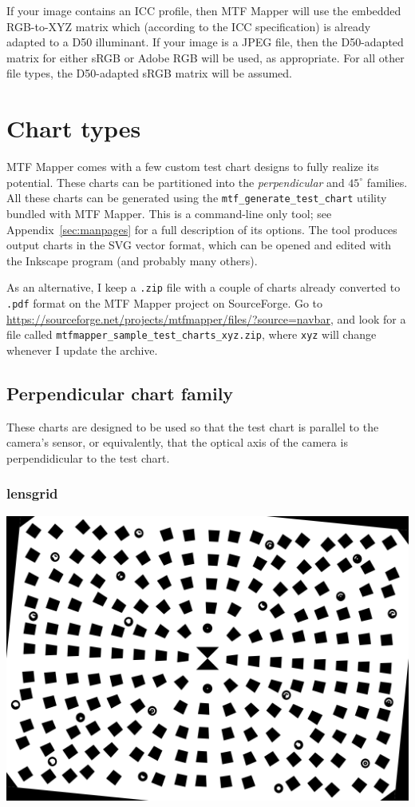 \documentclass[a4paper]{article}
\begin{document}
If your image contains an ICC profile, then MTF Mapper will use the embedded
RGB-to-XYZ matrix which (according to the ICC specification) is already
adapted to a D50 illuminant. If your image is a JPEG file, then the
D50-adapted matrix for either sRGB or Adobe RGB will be used, as appropriate.
For all other file types, the D50-adapted sRGB matrix will be assumed.

\newpage

\section{Chart types}
\label{sec:chart_types}
MTF Mapper comes with a few custom test chart designs to fully realize its
potential. These charts can be partitioned into the \emph{perpendicular} and
\emph{$45^\circ$} families. All these charts can be generated using the
\texttt{mtf\_generate\_test\_chart} utility bundled with MTF Mapper. This is a
command-line only tool; see Appendix~\ref{sec:manpages} for a full
description of its options. The tool produces output charts in the SVG
vector format, which can be opened and edited with the Inkscape program (and
probably many others).

As an alternative, I keep a \texttt{.zip} file with a couple of charts
already converted to \texttt{.pdf} format on the MTF Mapper project on
SourceForge. Go to
\url{https://sourceforge.net/projects/mtfmapper/files/?source=navbar}, and
look for a file called \newline
\texttt{mtfmapper\_sample\_test\_charts\_xyz.zip}, \newline
where \texttt{xyz} will change whenever I update the archive.

\subsection{Perpendicular chart family}
These charts are designed to be used so that the test chart is parallel to
the camera's sensor, or equivalently, that the optical axis of the camera is
perpendidicular to the test chart.
\subsubsection{lensgrid}

\parbox{\textwidth}{
\centering
\includegraphics[width=\textwidth]{figures/chart_lensgrid}
}
\end{document}
